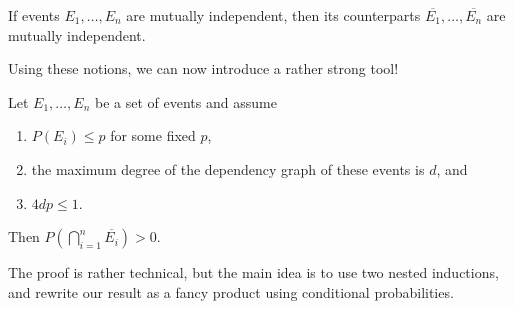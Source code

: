 \begin{lemma}
    If events $E_1, \dots, E_n$ are mutually independent, then its counterparts $\overline{E_1}, \dots, \overline{E_n}$ are mutually independent.
\end{lemma}
Using these notions, we can now introduce a rather strong tool!
\begin{lemma}
    \label{thm:lll}
    Let $E_1, \dots, E_n$ be a set of events and assume
    \begin{enumerate}
        \item $P(E_i) \leq p$ for some fixed $p$,
        \item the maximum degree of the dependency graph of these events is $d$, and
        \item $4dp \leq 1$.
    \end{enumerate}
    Then $P(\bigcap_{i=1}^n \overline{E_i}) > 0$.
\end{lemma}
The proof is rather technical, but the main idea is to use two nested inductions,
and rewrite our result as a fancy product using conditional probabilities.

